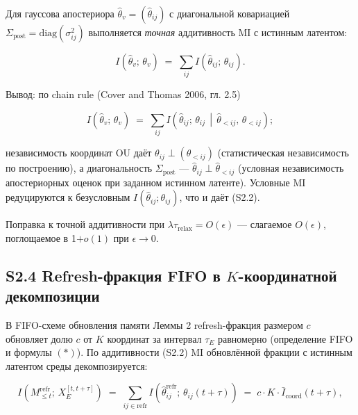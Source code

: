 \documentclass[pdflatex,sn-mathphys-ay]{sn-jnl}
\providecommand{\lt}{<}\providecommand{\gt}{>}
\begin{document}
Для гауссова апостериора \(\hat\theta_v = (\hat\theta_{ij})\) с диагональной ковариацией \(\Sigma_{\text{post}} = \text{diag}(\sigma_{ij}^2)\) выполняется \emph{точная} аддитивность MI с истинным латентом:



\begin{equation}I(\hat\theta_v;\, \theta_v) \;=\; \sum_{ij} I(\hat\theta_{ij};\, \theta_{ij}). \tag{S2.2}\end{equation}



Вывод: по chain rule (Cover and Thomas 2006, гл. 2.5)



\[I(\hat\theta_v;\, \theta_v) \;=\; \sum_{ij} I\!\left(\hat\theta_{ij};\, \theta_{ij} \,\middle|\, \hat\theta_{\lt ij},\, \theta_{\lt ij}\right);\]



независимость координат OU даёт \(\theta_{ij} \perp (\theta_{\lt ij})\) (статистическая независимость по построению), а диагональность \(\Sigma_{\text{post}}\) --- \(\hat\theta_{ij} \perp \hat\theta_{\lt ij}\) (условная независимость апостериорных оценок при заданном истинном латенте). Условные MI редуцируются к безусловным \(I(\hat\theta_{ij}; \theta_{ij})\), что и даёт (S2.2).



Поправка к точной аддитивности при \(\lambda \tau_{\text{relax}} = O(\epsilon)\) --- слагаемое \(O(\epsilon)\), поглощаемое в 1\(+ o(1)\) при \(\epsilon \to 0\).



\subsection*{\texorpdfstring{S2.4 Refresh-фракция FIFO в \(K\)-координатной декомпозиции}{S2.4 Refresh-фракция FIFO в K-координатной декомпозиции}}\label{s2.4-refresh-ux444ux440ux430ux43aux446ux438ux44f-fifo-ux432-k-ux43aux43eux43eux440ux434ux438ux43dux430ux442ux43dux43eux439-ux434ux435ux43aux43eux43cux43fux43eux437ux438ux446ux438ux438}



В FIFO-схеме обновления памяти Леммы 2 refresh-фракция размером \(c\) обновляет долю \(c\) от \(K\) координат за интервал \(\tau_E\) равномерно (определение FIFO и формулы \((*)\)). По аддитивности (S2.2) MI обновлённой фракции с истинным латентом среды декомпозируется:



\begin{equation}I(M_{\le t}^{\text{refr}};\, X_E^{[t, t+\tau]}) \;=\; \sum_{ij \in \text{refr}} I(\hat\theta_{ij}^{\text{refr}};\, \theta_{ij}(t+\tau)) \;=\; c \cdot K \cdot \bar I_{\text{coord}}(t+\tau), \tag{S2.3}\end{equation}
\end{document}
